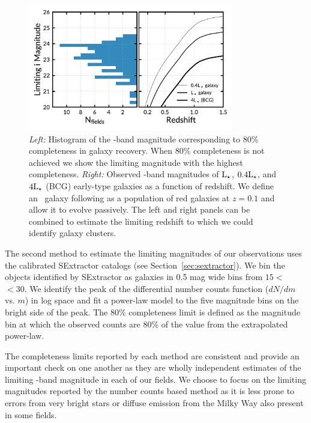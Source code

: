 \documentclass[apj, revtex4-1]{emulateapj}
\begin{document}
\begin{figure}
	\centering
	\includegraphics[width=0.8\textwidth]{figures/recovery_redshift.pdf}
	\caption{\textit{Left:} Histogram of the \sdssi-band magnitude corresponding to 80\% completeness in galaxy recovery. When 80\% completeness is not achieved we show the limiting magnitude with the highest completeness. \textit{Right:} Observed \sdssi-band magnitudes of $\hbox{L$_{\star}$}$, $0.4\hbox{L$_{\star}$}$, and $4\hbox{L$_{\star}$}$ (BCG) early-type galaxies as a function of redshift. We define an \lstar\ galaxy following \cite{Blanton2003} as a population of red galaxies at $z = 0.1$ and allow it to evolve passively. The left and right panels can be combined to estimate the limiting redshift to which we could identify galaxy clusters.}
	\label{fig:recovery_redshift}
\end{figure}

The second method to estimate the limiting magnitudes of our observations uses the calibrated SExtractor catalogs (see Section~\ref{sec:sextractor}). We bin the objects identified by SExtractor as galaxies in 0.5 mag wide bins from $15<$ \sdssi\ $<30$. We identify the peak of the differential number counts function ($dN/dm$ vs. $m$) in log space and fit a power-law model to the five magnitude bins on the bright side of the peak. The 80\% completeness limit is defined as the magnitude bin at which the observed counts are 80\% of the value from the extrapolated power-law.

The completeness limits reported by each method are consistent and provide an important check on one another as they are wholly independent estimates of the limiting \sdssi-band magnitude in each of our fields. We choose to focus on the limiting magnitudes reported by the number counts based method as it is less prone to errors from very bright stars or diffuse emission from the Milky Way also present in some fields.
\end{document}
